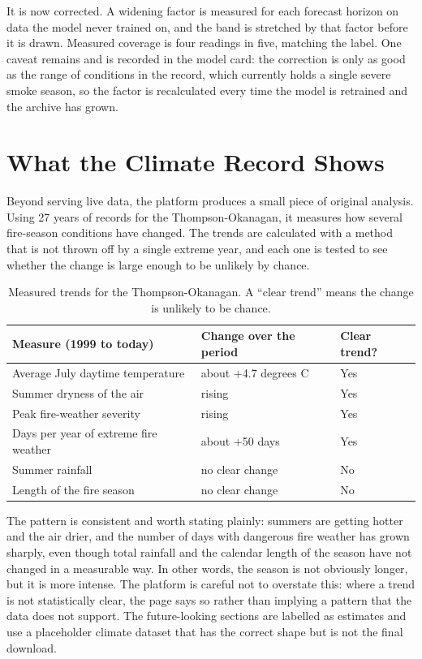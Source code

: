 \documentclass[11pt]{article}
\begin{document}
It is now corrected. A widening factor is measured for each forecast horizon on
data the model never trained on, and the band is stretched by that factor
before it is drawn. Measured coverage is four readings in five, matching the
label. One caveat remains and is recorded in the model card: the correction is
only as good as the range of conditions in the record, which currently holds a
single severe smoke season, so the factor is recalculated every time the model
is retrained and the archive has grown.

\section{What the Climate Record Shows}

Beyond serving live data, the platform produces a small piece of original
analysis. Using 27 years of records for the Thompson-Okanagan, it measures how
several fire-season conditions have changed. The trends are calculated with a
method that is not thrown off by a single extreme year, and each one is tested
to see whether the change is large enough to be unlikely by chance.

\begin{table}[h]
\centering
\small
\begin{tabular}{@{}L{6.2cm}L{4.0cm}L{2.8cm}@{}}
\toprule
\textbf{Measure (1999 to today)} & \textbf{Change over the period} & \textbf{Clear trend?} \\
\midrule
Average July daytime temperature & about +4.7 degrees C & Yes \\
Summer dryness of the air & rising & Yes \\
Peak fire-weather severity & rising & Yes \\
Days per year of extreme fire weather & about +50 days & Yes \\
Summer rainfall & no clear change & No \\
Length of the fire season & no clear change & No \\
\bottomrule
\end{tabular}
\caption{Measured trends for the Thompson-Okanagan. A ``clear trend'' means the
change is unlikely to be chance.}
\end{table}

The pattern is consistent and worth stating plainly: summers are getting hotter
and the air drier, and the number of days with dangerous fire weather has grown
sharply, even though total rainfall and the calendar length of the season have
not changed in a measurable way. In other words, the season is not obviously
longer, but it is more intense. The platform is careful not to overstate this:
where a trend is not statistically clear, the page says so rather than implying
a pattern that the data does not support. The future-looking sections are
labelled as estimates and use a placeholder climate dataset that has the correct
shape but is not the final download.
\end{document}
